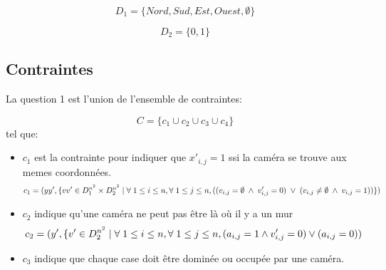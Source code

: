 \documentclass[a4paper,11pt]{article}
\begin{document}
$$D_1 = \{Nord, Sud, Est, Ouest, \emptyset\}$$

$$D_2 = \{0,1\}$$

\subsection{Contraintes}
La question 1 est l'union de l’ensemble de contraintes:

$$C = \{c_{1} \cup c_{2} \cup c_{3} \cup c_{4}\} $$
tel que:
\begin{itemize}
\item $c_{1}$ est la contrainte pour indiquer que $x'_{i,j} = 1$ ssi la caméra se trouve aux memes coordonnées.
  $$c_{1} = ( yy', \{ vv' \in  D_1^{n^2} \times D_2^{n^2} \mid \forall \hspace{0.1cm} 1\leq i \leq n, \forall \hspace{0.1cm} 1\leq j \leq n,
  ((v_{i,j} = \emptyset \hspace{0.1cm} \wedge \hspace{0.1cm} v'_{i,j} = 0)
   \hspace{0.1cm} \vee \hspace{0.1cm}
  (v_{i,j}  \neq \emptyset \hspace{0.1cm}\wedge \hspace{0.1cm} v_{i,j} = 1)) \} ) $$
   
\item $c_{2}$ indique qu'une caméra ne peut pas être là où il y a un mur 
  $$c_{2} = ( y', \{ v' \in D_2^{n^2} \mid \forall \hspace{0.1cm} 1\leq i \leq n, \forall \hspace{0.1cm} 1\leq j \leq n, (a_{i,j} = 1 \wedge v'_{i,j} = 0 ) \vee (a_{i,j} = 0))$$  

\item $c_{3}$ indique que chaque case doit être dominée ou occupée par une caméra.


\end{itemize}
\end{document}
